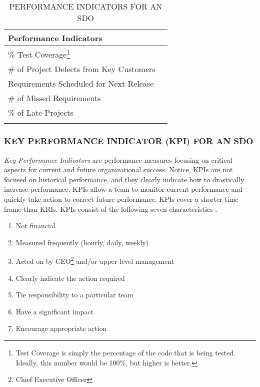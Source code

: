 \documentclass[SDSUThesis.tex]{subfiles}
\begin{document}
            \begin{longtable}{@{}l l}
                \toprule%
                 \centering%
                 {\bfseries Performance Indicators} &
                 \\
                
                \cmidrule[0.4pt](r{0.125em}){1-1}%
                \endhead
                
                \% Test Coverage\footnote{Test Coverage is simply the percentage 
                    of the code that is being tested. Ideally, this 
                    number would be 100\%, but higher is better.}   \\
                \myrowcolour%
                \# of Project Defects from Key Customers  \\
                Requirements Scheduled for Next Release  \\
                \myrowcolour%
                \# of Missed Requirements \\
                \% of Late Projects \\
                
                \bottomrule
                
                \caption{PERFORMANCE INDICATORS FOR AN SDO}
                \label{tab:PI}
            \end{longtable}
            
        \subsubsection{KEY PERFORMANCE INDICATOR (KPI) FOR AN SDO}
            \textit{Key Performance Indicators} are performance measures
            focusing on critical aspects for current and future organizational
            success.  Notice, KPIs are not focused on historical performance,
            and they clearly indicate how to drastically increase performance.
            KPIs allow a team to monitor current performance and 
            quickly take action to correct future performance.
            KPIs cover a shorter time frame than KRIs.
            KPIs consist of the following seven characteristics \cite{parmenter2010}.
            \begin{enumerate}
                \item Not financial
                \item Measured frequently (hourly, daily, weekly)
                \item Acted on by CEO\footnote{Chief Executive Officer} 
                    and/or upper-level management 
                \item Clearly indicate the action required
                \item Tie responsibility to a particular team
                \item Have a significant impact
                \item Encourage appropriate action
            \end{enumerate}
            
\end{document}
